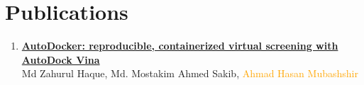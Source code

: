 \section{Publications}

\begin{enumerate}[noitemsep,topsep=0pt,leftmargin=*]

    \item \textbf{\href{https://doi.org/10.5281/zenodo.22035568}{AutoDocker: reproducible, containerized virtual screening with AutoDock Vina}}\\
    Md Zahurul Haque, Md. Mostakim Ahmed Sakib, \textcolor{orange}{ Ahmad Hasan Mubashshir}\\

\end{enumerate}
